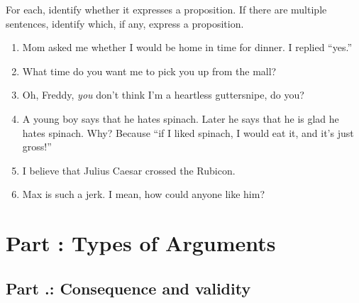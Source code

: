 \problempart
\label{pr.IDprops}
For each, identify whether it expresses a proposition. If there are multiple sentences, identify which, if any, express a proposition.
\begin{enumerate}
\item Mom asked me whether I would be home in time for dinner. I replied ``yes.''
\item What time do you want me to pick you up from the mall? 
\item Oh, Freddy, \emph{you} don't think I'm a heartless guttersnipe, do you?
\item A young boy says that he hates spinach. Later he says that he is glad he hates spinach. Why? Because ``if I liked spinach, I would eat it, and it's just gross!''
\item I believe that Julius Caesar crossed the Rubicon.
\item Max is such a jerk. I mean, how could anyone like him? 
\end{enumerate}

\chapter{Part \thechapcount: Types of Arguments}\setcounter{seccount}{1}
\label{s:Valid}
\section{Part \thechapcount.\theseccount: Consequence and validity}

